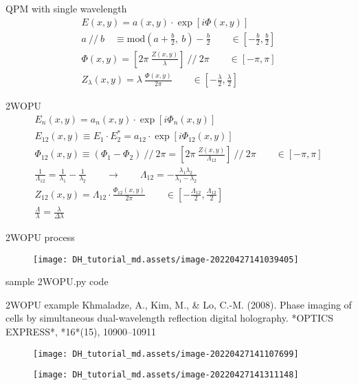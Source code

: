 \documentclass[t, aspectratio=169]{beamer}
\begin{document}
\begin{frame}{QPM with single wavelength}
	\begin{gather*}
E(x,y) = a(x,y)\cdot\exp[i\Phi(x,y)] \\
a \ //\ b \quad \equiv \textrm{mod}\left(a+\frac{b}{2},\ b\right)-\frac{b}{2} \qquad \in \left[-\frac{b}{2}, \frac{b}{2}\right]\\
\Phi(x,y) = \left[ 2\pi\ \frac{Z(x,y)}{\lambda} \right] \ //\ 2\pi \qquad \in [-\pi,\pi] \\
Z_\lambda(x,y) = \lambda\ \frac{\Phi(x,y)}{2\pi} \qquad \in \left[-\frac{\lambda}{2}, \frac{\lambda}{2}\right]
	\end{gather*}
\end{frame}


\begin{frame}{2WOPU}
	\begin{gather*}
E_n(x,y) = a_n(x,y)\cdot\exp[i\Phi_n(x,y)] \\
E_{12}(x,y) \equiv E_1\cdot E_2^* = a_{12}\cdot\exp[i\Phi_{12}(x,y)]\\
\Phi_{12}(x,y) \equiv (\Phi_1 - \Phi_2) \ //\ 2\pi = \left[ 2\pi\ \frac{Z(x,y)}{\Lambda_{12}} \right]\ //\ 2\pi \qquad \in [-\pi,\pi] \\
\frac{1}{\Lambda_{12}} = \frac{1}{\lambda_1} - \frac{1}{\lambda_2} \qquad\rightarrow\qquad \Lambda_{12} = -\frac{\lambda_1 \lambda_2}{\lambda_1 - \lambda_2} \\
Z_{12}(x,y) = \Lambda_{12}\cdot\frac{\Phi_{12}(x,y)}{2\pi} \qquad \in\left[-\frac{\Lambda_{12}}{2}, \frac{\Lambda_{12}}{2} \right] \\
\frac{\Lambda}{\lambda} = \frac{\lambda}{\Delta\lambda}
	\end{gather*}
\end{frame}


\begin{frame}{2WOPU process}
	\begin{figure}
		\texttt{[image: DH\_tutorial\_md.assets/image-20220427141039405]}
	\end{figure}
\end{frame}


\begin{frame}[fragile]{sample 2WOPU.py code}
\begin{semiverbatim}

\end{semiverbatim}
\end{frame}


\begin{frame}[allowframebreaks]{2WOPU example}
Khmaladze, A., Kim, M., \& Lo, C.-M. (2008). Phase imaging of cells by simultaneous dual-wavelength reflection digital holography. *OPTICS EXPRESS*, *16*(15), 10900–10911
\begin{figure}
	\texttt{[image: DH\_tutorial\_md.assets/image-20220427141107699]}
\end{figure}
\begin{figure}
	\texttt{[image: DH\_tutorial\_md.assets/image-20220427141311148]}
\end{figure}
\end{frame}
\end{document}
